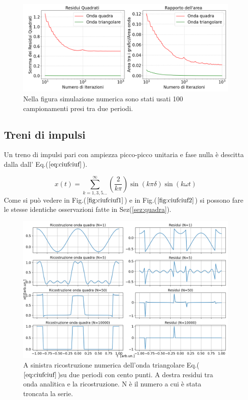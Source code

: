 \documentclass{article}
\begin{document}
      

        \begin{figure}[H]
            \centering
            \includegraphics[width=1.2\textwidth]{residuals2.png} %
            \caption{Nella figura simulazione numerica sono stati usati 100 campionamenti presi tra due periodi.}
            \label{fig:res2}
        \end{figure}

    \subsection{Treni di impulsi}
    Un treno di impulsi pari con ampiezza picco-picco unitaria e fase nulla è descitta dalla
    dall' Eq.($\ref{eq:ciufciuf}$).

    \begin{equation}
        x(t) = \sum_{k=1,3,5...}^{\infty} \left(\frac{2}{k\pi}\right)\sin\left(k\pi\delta\right)\sin\left(k\omega t\right)
        \label{eq:ciufciuf}
    \end{equation}
    Come si può vedere in Fig.($\ref{fig:ciufciuf1} $) e in Fig.($\ref{fig:ciufciuf2} $)
    si possono fare le stesse identiche osservazioni fatte in Sez(\ref{sez:quadra}).
    \begin{figure}[H]
        \centering
        \includegraphics[width=1.2\textwidth]{foupulsetrainwave1e2.png} %
        \caption{A sinistra ricostruzione numerica dell'onda triangolare
        Eq.($\ref{eq:ciufciuf}$)su due periodi con cento punti.
        A destra residui tra onda analitica e la ricostruzione.
        N è il numero a cui è stata troncata la serie. }
        \label{fig:ciufciuf1}
    \end{figure}
\end{document}
